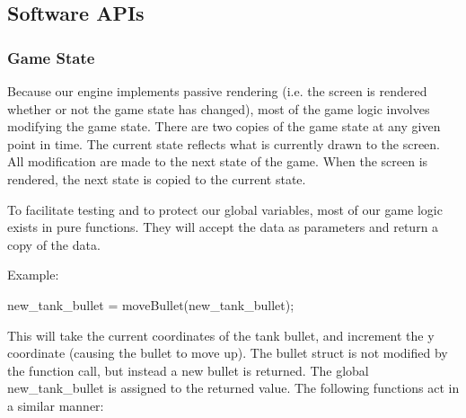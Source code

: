 \documentclass[11pt,letter,oneside]{report}
\begin{document}
\subsection{Software APIs}
\subsubsection{Game State}
Because our engine implements passive rendering (i.e. the screen is rendered whether or not the game state has changed), most of the game logic involves modifying the game state.  There are two copies of the game state at any given point in time.  The current state reflects what is currently drawn to the screen.  All modification are made to the next state of the game.  When the screen is rendered, the next state is copied to the current state.

To facilitate testing and to protect our global variables, most of our game logic exists in pure functions.  They will accept the data as parameters and return a copy of the data.

Example:

new\_tank\_bullet = moveBullet(new\_tank\_bullet);

This will take the current coordinates of the tank bullet, and increment the y coordinate (causing the bullet to move up).  The bullet struct is not modified by the function call, but instead a new bullet is returned.  The global new\_tank\_bullet is assigned to the returned value.  The following functions act in a similar manner:
\end{document}
